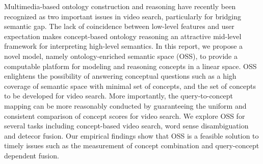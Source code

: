 
Multimedia-based ontology construction and reasoning have recently
been recognized as two important issues in video search,
particularly for bridging semantic gap. The lack of coincidence
between low-level features and user expectation makes concept-based
ontology reasoning an attractive mid-level framework for
interpreting high-level semantics. In this report, we propose a
novel model, namely ontology-enriched semantic space (OSS), to
provide a computable platform for modeling and reasoning concepts in
a linear space. OSS enlightens the possibility of answering
conceptual questions such as a high coverage of semantic space with
minimal set of concepts, and the set of concepts to be developed for
video search. More importantly, the query-to-concept mapping can be
more reasonably conducted by guaranteeing the uniform and consistent
comparison of concept scores for video search. We explore OSS for
several tasks including concept-based video search, word sense
disambiguation and detecor fusion. Our empirical findings show that
OSS is a feasible solution to timely issues such as the measurement
of concept combination and query-concept dependent fusion.
